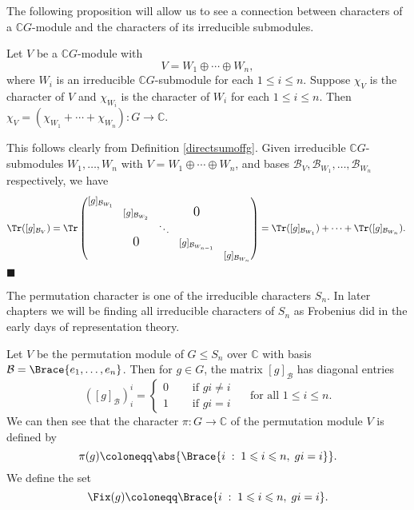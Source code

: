 \documentclass[../Project.tex]{subfiles}
\begin{document}
The following proposition will allow us to see a connection between characters of a $\mathbb{C}G$-module and the characters of its irreducible submodules.
\begin{prop}[{\cite[Proposition 13.18]{2}}]
	\label{directsumchar}
	Let $V$ be a $\mathbb{C}G$-module with
	$$V = W_1 \oplus \cdots \oplus W_n,$$
	where $W_i$ is an irreducible $\mathbb{C}G$-submodule for each $1 \leqslant i \leqslant n$.
	Suppose $\chi_V$ is the character of $V$ and $\chi_{W_i}$ is the character of $W_i$ for each $1 \leqslant i \leqslant n$.
	Then $\chi_V = (\chi_{W_1} + \cdots + \chi_{W_n}) : G \to \mathbb{C}$.
\end{prop}

\begin{proo*}
	This follows clearly from Definition \ref{directsumoffg}. Given irreducible $\mathbb{C}G$-submodules $W_1,\dots,W_n$ with $V = W_1 \oplus \cdots \oplus W_n$, and bases $\mathcal{B}_V,{\mathcal{B}_{W_1}},\dots,{\mathcal{B}_{W_n}}$ respectively, we have
	$$\Tr([g]_{\mathcal{B}_V}) = \Tr \begin{pmatrix}
	[g]_{\mathcal{B}_{W_1}} &  & &  & \\
	 & [g]_{\mathcal{B}_{W_2}} & & \text{\Large{0}}&  \\
	& & \ddots & & \\
	 & \text{\Large{0}} & & [g]_{\mathcal{B}_{W_{n-1}}} & \\ 
	&  & & & [g]_{\mathcal{B}_{W_n}}\end{pmatrix} = \Tr([g]_{\mathcal{B}_{W_1}}) + \cdots + \Tr([g]_{\mathcal{B}_{W_n}}). \;$$
	\hfill $\blacksquare$\\
\end{proo*}

The permutation character is one of the irreducible characters $S_n$. In later chapters we will be finding all irreducible characters of $S_n$ as Frobenius did in the early days of representation theory.
\begin{defi}
	Let $V$ be the permutation module of $G \leqslant S_n$ over $\mathbb{C}$ with basis $\mathcal{B} = \Brace{e_1,\dots,e_n}$. Then for $g \in G$, the matrix $[g]_\mathcal{B}$ has diagonal entries
	$$([g]_\mathcal{B})^i_i = \begin{cases}0 \quad &\text{ if }gi \neq i\\1 \quad &\text{ if }gi = i\end{cases} \quad \text{ for all } 1 \leqslant i \leqslant n.$$
	We can then see that the character  $\pi : G \to \mathbb{C}$ of the permutation module $V$ is defined by
	$$\pi(g) \coloneqq \abs{\Brace{i \;:\; 1 \leqslant i \leqslant n,\; gi = i}}.$$
	We define the set
	$$\Fix(g) \coloneqq \Brace{i \;:\; 1 \leqslant i \leqslant n,\; gi = i}.$$

\end{defi}
\end{document}
